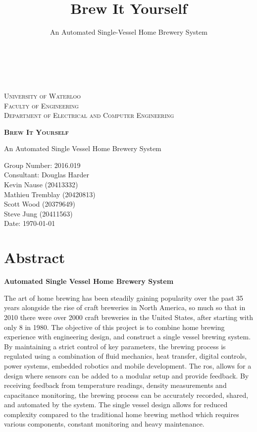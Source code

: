 \documentclass{article}
\author{\\\\}
\title{Brew It Yourself}
\subtitle{An Automated Single-Vessel Home Brewery System}
\begin{document}
\begin{titlepage}
    \begin{center}
        \vspace*{1cm}
        
        
        \textsc{\LARGE University of Waterloo}\\ [0.1cm]
        \textsc{\Large Faculty of Engineering}\\
        \textsc{Department of Electrical and Computer Engineering}

		\vspace{4.5cm}

        \textsc{\Huge \textbf{Brew It Yourself}}
        
        \vspace{0.2cm}
        An Automated Single Vessel Home Brewery System
                
        \vfill
        
        Group Number: 2016.019
		\\Consultant: Douglas Harder
        \vspace{0.5cm}
        \\Kevin Nause (20413332) 
        \\Mathieu Tremblay (20420813) 
        \\Scott Wood (20379649) 
        \\Steve Jung (20411563) 
        \vspace{0.5cm}
        \\Date: \today
        \vspace{3.0cm}
    \end{center}
\end{titlepage}

\justify
\onehalfspacing

\pagebreak
\section*{Abstract}

\textbf{Automated Single Vessel Home Brewery System}

The art of home brewing has been steadily gaining popularity over the past 35 years alongside the rise of craft breweries in North America, so much so that in 2010 there were over 2000 craft breweries in the United States, after starting with only 8 in 1980. The objective of this project is
to combine home brewing experience with engineering design, and construct a single vessel brewing system. By maintaining a strict control of key parameters, the brewing process is regulated using a combination of fluid mechanics, heat transfer, digital controls, power systems, embedded robotics and mobile development. The \gls{ros}, allows for a design where sensors can be added to a modular setup and provide feedback. By receiving feedback from temperature readings, density measurements and capacitance monitoring, the brewing process can be accurately recorded, shared, and automated by the system. The single vessel design allows for reduced complexity compared to the traditional home brewing method which requires various components, constant monitoring and heavy maintenance.
\end{document}
